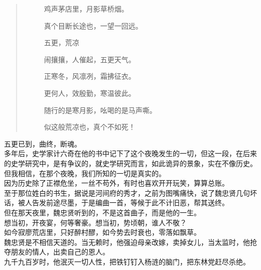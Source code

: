 \begin{multicols}{\theparacolNo}
\begin{quote}
\begin{spacing}{0.5}
{{\begin{description}
					\item[\textcolor{Gray}{\faQuoteRight}] 鸡声茅店里，月影草桥烟。
					\item[\textcolor{Gray}{\faQuoteRight}] 真个目断长途也，一望一回远。
					\item[\textcolor{Gray}{\faQuoteRight}] 五更，荒凉
					\item[\textcolor{Gray}{\faQuoteRight}] 闹攘攘，人催起，五更天气。
					\item[\textcolor{Gray}{\faQuoteRight}] 正寒冬，风凛冽，霜拂征衣。
					\item[\textcolor{Gray}{\faQuoteRight}] 更何人，效殷勤，寒温彼此。
					\item[\textcolor{Gray}{\faQuoteRight}] 随行的是寒月影，吆喝的是马声嘶。
					\item[\textcolor{Gray}{\faQuoteRight}] 似这般荒凉也，真个不如死！
				\end{description}
		}}
	\end{spacing}
\end{quote}

五更已到，曲终，断魂。\\

多年后，史学家计六奇在他的书中记下了这个夜晚发生的一切，但这一段，在后来的史学研究中，是有争议的，就史学研究而言，如此诡异的景象，实在不像历史。\\

但我相信，在那个夜晚，我们所知的一切是真实的。\\

因为历史除了正襟危坐，一丝不苟外，有时也喜欢开开玩笑，算算总账。\\

至于那位姓白的书生，据说是河间府的秀才，之前为图嘴痛快，说了魏忠贤几句坏话，被人告发前途尽墨，于是编曲一首，等候于此不计旧恶，帮其送终。\\

但在那天夜里，魏忠贤听到的，不是这首曲子，而是他的一生。\\

想当初，开夜宴，何等奢豪。想当初，势顷朝，谁人不敬？\\

如今寂廖荒店里，只好醉村醪，如今势去时衰也，零落如飘草。\\

魏忠贤是不相信天道的。当无赖时，他强迫母亲改嫁，卖掉女儿，当太监时，他抢夺朋友的情人，出卖自己的恩人。\\

九千九百岁时，他泯灭一切人性，把铁钉钉入杨涟的脑门，把东林党赶尽杀绝。\\


\end{multicols}
